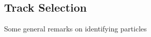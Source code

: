 \subsection{Track Selection}
\label{TrackSelection}

Some general remarks on identifying particles



